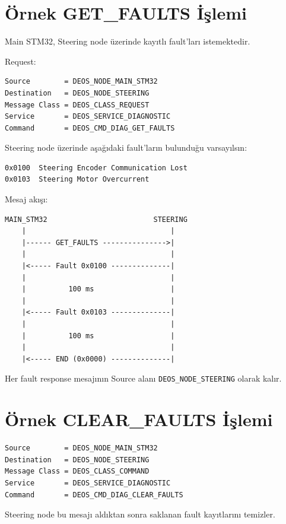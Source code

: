 \documentclass[a4paper,11pt]{article}
\begin{document}
\section{Örnek GET\_FAULTS İşlemi}

Main STM32, Steering node üzerinde kayıtlı fault'ları istemektedir.

Request:

\begin{lstlisting}
Source        = DEOS_NODE_MAIN_STM32
Destination   = DEOS_NODE_STEERING
Message Class = DEOS_CLASS_REQUEST
Service       = DEOS_SERVICE_DIAGNOSTIC
Command       = DEOS_CMD_DIAG_GET_FAULTS
\end{lstlisting}

Steering node üzerinde aşağıdaki fault'ların bulunduğu varsayılsın:

\begin{lstlisting}
0x0100  Steering Encoder Communication Lost
0x0103  Steering Motor Overcurrent
\end{lstlisting}

Mesaj akışı:

\begin{lstlisting}
MAIN_STM32                         STEERING
    |                                  |
    |------ GET_FAULTS --------------->|
    |                                  |
    |<----- Fault 0x0100 --------------|
    |                                  |
    |          100 ms                  |
    |                                  |
    |<----- Fault 0x0103 --------------|
    |                                  |
    |          100 ms                  |
    |                                  |
    |<----- END (0x0000) --------------|
\end{lstlisting}

Her fault response mesajının Source alanı
\texttt{DEOS\_NODE\_STEERING} olarak kalır.

\section{Örnek CLEAR\_FAULTS İşlemi}

\begin{lstlisting}
Source        = DEOS_NODE_MAIN_STM32
Destination   = DEOS_NODE_STEERING
Message Class = DEOS_CLASS_COMMAND
Service       = DEOS_SERVICE_DIAGNOSTIC
Command       = DEOS_CMD_DIAG_CLEAR_FAULTS
\end{lstlisting}

Steering node bu mesajı aldıktan sonra saklanan fault kayıtlarını
temizler.
\end{document}
